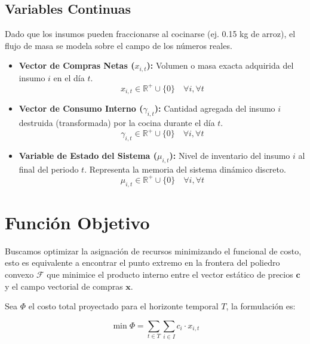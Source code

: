 \documentclass[12pt, a4paper]{article}
\begin{document}
\subsection{Variables Continuas}
Dado que los insumos pueden fraccionarse al cocinarse (ej. 0.15 kg de arroz), el flujo de masa se modela sobre el campo de los números reales.
\begin{itemize}
    \item \textbf{Vector de Compras Netas ($x_{i,t}$):} Volumen o masa exacta adquirida del insumo $i$ en el día $t$.
    \begin{equation}
        x_{i,t} \in \mathbb{R}^{+} \cup \{0\} \quad \forall i, \forall t
    \end{equation}

    \item \textbf{Vector de Consumo Interno ($\gamma_{i,t}$):} Cantidad agregada del insumo $i$ destruida (transformada) por la cocina durante el día $t$.
    \begin{equation}
        \gamma_{i,t} \in \mathbb{R}^{+} \cup \{0\} \quad \forall i, \forall t
    \end{equation}

    \item \textbf{Variable de Estado del Sistema ($\mu_{i,t}$):} Nivel de inventario del insumo $i$ al final del periodo $t$. Representa la memoria del sistema dinámico discreto.
    \begin{equation}
        \mu_{i,t} \in \mathbb{R}^{+} \cup \{0\} \quad \forall i, \forall t
    \end{equation}
\end{itemize}

\section{Función Objetivo}

Buscamos optimizar la asignación de recursos minimizando el funcional de costo, esto es equivalente a encontrar el punto extremo en la frontera del poliedro convexo $\mathcal{F}$ que minimice el producto interno entre el vector estático de precios $\mathbf{c}$ y el campo vectorial de compras $\mathbf{x}$.

Sea $\Phi$ el costo total proyectado para el horizonte temporal $T$, la formulación es:

\begin{equation}
    \min \Phi = \sum_{t \in T} \sum_{i \in I} c_i \cdot x_{i,t}
\end{equation}
\end{document}

